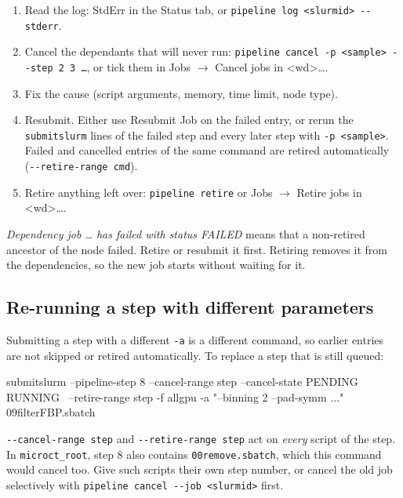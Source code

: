 \documentclass[11pt,a4paper]{article}
\newcommand{\cmd}[1]{\texttt{#1}}
\newcommand{\menu}[1]{\textsf{#1}}
\begin{document}
\begin{enumerate}
  \item Read the log: \menu{StdErr} in the Status tab, or \cmd{pipeline log <slurmid> -{}-stderr}.
  \item Cancel the dependants that will never run:
    \cmd{pipeline cancel -p <sample> -{}-step 2 3 \ldots}, or tick them in
    \menu{Jobs $\rightarrow$ Cancel jobs in <wd>\ldots}.
  \item Fix the cause (script arguments, memory, time limit, node type).
  \item Resubmit. Either use \menu{Resubmit Job} on the failed entry, or rerun the
    \cmd{submitslurm} lines of the failed step and every later step with \cmd{-p <sample>}.
    Failed and cancelled entries of the same command are retired automatically
    (\cmd{-{}-retire-range cmd}).
  \item Retire anything left over: \cmd{pipeline retire} or
    \menu{Jobs $\rightarrow$ Retire jobs in <wd>\ldots}.
\end{enumerate}

\begin{note}
\emph{Dependency job \ldots{} has failed with status FAILED} means that a non-retired ancestor of the
node failed. Retire or resubmit it first. Retiring removes it from the dependencies, so the new job
starts without waiting for it.
\end{note}

\subsection{Re-running a step with different parameters}

Submitting a step with a different \cmd{-a} is a different command, so earlier entries are not
skipped or retired automatically. To replace a step that is still queued:

\begin{terminal}
submitslurm --pipeline-step 8 --cancel-range step --cancel-state PENDING RUNNING \
            --retire-range step -f allgpu -a "--binning 2 --pad-symm ..." 09filterFBP.sbatch
\end{terminal}

\begin{warning}[Range \cmd{step}]
\cmd{-{}-cancel-range step} and \cmd{-{}-retire-range step} act on \emph{every} script of the step.
In \cmd{microct\_root}, step 8 also contains \cmd{00remove.sbatch}, which this command would cancel
too. Give such scripts their own step number, or cancel the old job selectively with
\cmd{pipeline cancel -{}-job <slurmid>} first.
\end{warning}
\end{document}

